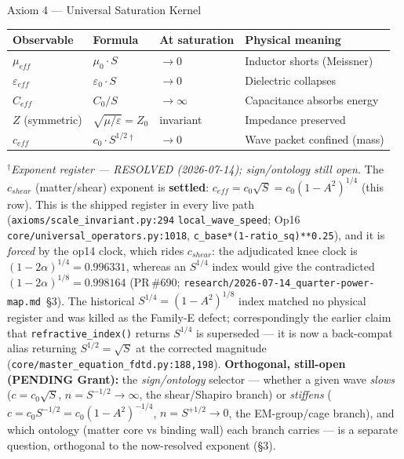 \begin{resultbox}{Axiom 4 — Universal Saturation Kernel}
\begin{center}\small
\begin{tabular}{llll}
\toprule
\textbf{Observable} & \textbf{Formula} & \textbf{At saturation} & \textbf{Physical meaning} \\
\midrule
$\mu_{eff}$   & $\mu_0 \cdot S$       & $\to 0$       & Inductor shorts (Meissner) \\
$\varepsilon_{eff}$ & $\varepsilon_0 \cdot S$ & $\to 0$     & Dielectric collapses \\
$C_{eff}$     & $C_0 / S$             & $\to \infty$  & Capacitance absorbs energy \\
$Z$ (symmetric) & $\sqrt{\mu/\varepsilon} = Z_0$ & invariant & Impedance preserved \\
$c_{eff}$     & $c_0 \cdot S^{1/2}$\,$^{\dagger}$  & $\to 0$       & Wave packet confined (mass) \\
\bottomrule
\end{tabular}
\end{center}

\smallskip\noindent\footnotesize $^{\dagger}$\emph{Exponent register --- RESOLVED (2026-07-14); sign/ontology still open.} The $c_{shear}$ (matter/shear) exponent is \textbf{settled}: $c_{eff} = c_0\sqrt{S} = c_0(1-A^2)^{1/4}$ (this row). This is the shipped register in every live path (\texttt{axioms/scale\_invariant.py:294} \texttt{local\_wave\_speed}; Op16 \texttt{core/universal\_operators.py:1018}, \texttt{c\_base*(1-ratio\_sq)**0.25}), and it is \emph{forced} by the op14 clock, which rides $c_{shear}$: the adjudicated knee clock is $(1-2\alpha)^{1/4}=0.996331$, whereas an $S^{1/4}$ index would give the contradicted $(1-2\alpha)^{1/8}=0.998164$ (PR\,\#690; \texttt{research/2026-07-14\_quarter-power-map.md}~\S3). The historical $S^{1/4}=(1-A^2)^{1/8}$ index matched no physical register and was killed as the Family-E defect; correspondingly the earlier claim that \texttt{refractive\_index()} returns $S^{1/4}$ is superseded --- it is now a back-compat alias returning $S^{1/2}=\sqrt{S}$ at the corrected magnitude (\texttt{core/master\_equation\_fdtd.py:188,198}). \textbf{Orthogonal, still-open (PENDING Grant):} the \emph{sign/ontology} selector --- whether a given wave \emph{slows} ($c=c_0\sqrt{S}$, $n=S^{-1/2}\to\infty$, the shear/Shapiro branch) or \emph{stiffens} ($c=c_0 S^{-1/2}=c_0(1-A^2)^{-1/4}$, $n=S^{+1/2}\to 0$, the EM-group/cage branch), and which ontology (matter core vs binding wall) each branch carries --- is a separate question, orthogonal to the now-resolved exponent (\S3).\normalsize


\end{resultbox}
